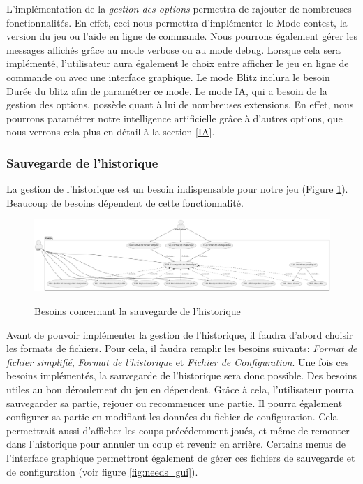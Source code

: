 \documentclass{article}
\begin{document}
L'implémentation de la \textit{gestion des options }permettra de rajouter de nombreuses fonctionnalités.
En effet, ceci nous permettra d'implémenter le Mode contest, la version du jeu ou l'aide en ligne de commande. Nous pourrons également gérer les messages affichés grâce au mode verbose ou au mode debug.
Lorsque cela sera implémenté, l'utilisateur aura également le choix entre afficher le jeu en ligne de commande ou avec une interface graphique.
Le mode Blitz inclura le besoin Durée du blitz afin de paramétrer ce mode.
Le mode IA, qui a besoin de la gestion des options, possède quant à lui de nombreuses extensions. En effet, nous pourrons paramétrer
notre intelligence artificielle grâce à d'autres options, que nous verrons cela plus en détail à la section \ref{IA}.


\subsubsection{Sauvegarde de l'historique}
La gestion de l'historique est un besoin indispensable pour notre jeu (Figure \ref{fig:needs_files}).
Beaucoup de besoins dépendent de cette fonctionnalité.
\begin{figure}[h]
    \caption{Besoins concernant la sauvegarde de l'historique}
    \centering
    \includegraphics[width=\textwidth,height=\textheight,keepaspectratio]{needs_files}
    \label{fig:needs_files}
\end{figure}

Avant de pouvoir implémenter la gestion de l'historique, il faudra d'abord choisir les formats de fichiers.
Pour cela, il faudra remplir les besoins suivants: \textit{Format de fichier simplifié}, \textit{Format de l'historique} et \textit{Fichier de Configuration}.
Une fois ces besoins implémentés, la sauvegarde de l'historique sera donc possible.
Des besoins utiles au bon déroulement du jeu en dépendent. Grâce à cela, l'utilisateur pourra sauvegarder
sa partie, rejouer ou recommencer une partie. Il pourra également configurer sa partie en modifiant les données du fichier de configuration.
Cela permettrait aussi d'afficher les coups précédemment joués, et même de remonter dans l'historique pour annuler un coup et revenir en arrière.
Certains menus de l'interface graphique permettront également de gérer ces fichiers de sauvegarde et de configuration (voir figure \ref{fig:needs_gui}).
\end{document}
